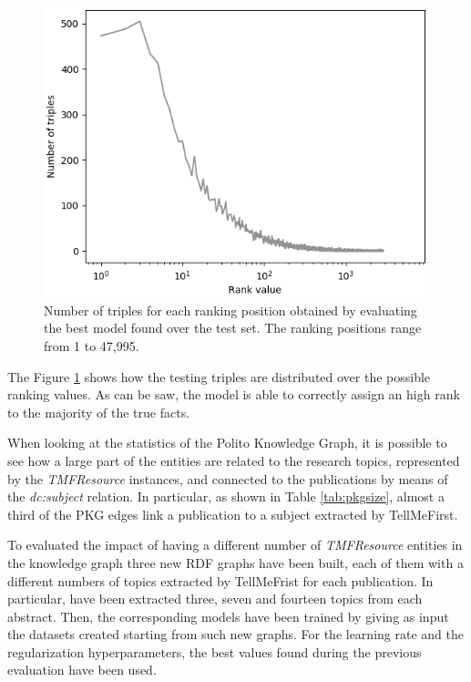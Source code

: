 \documentclass[%
    corpo=13.5pt,
    twoside,
    oldstyle,
    tipotesi=magistrale,
    greek,
    evenboxes
]{toptesi}
\begin{document}
\begin{figure}[h]
    \centering
    \includegraphics[scale=0.8]{img/num_triples_per_rank.png}
    \caption{
        Number of triples for each ranking position obtained by
        evaluating the best model found over the test set. The ranking
        positions range from 1 to 47,995.
    }
    \label{fig:num-triples-per-rank}
\end{figure}

The Figure \ref{fig:num-triples-per-rank} shows how the testing triples are
distributed over the possible ranking values.
As can be saw, the model is able to correctly assign an high rank to the
majority of the true facts.
\newpage

When looking at the statistics of the Polito Knowledge Graph, it is possible to
see how a large part of the entities are related
to the research topics, represented by the \emph{TMFResource} instances,
and connected to the publications by means of the \emph{dc:subject} relation.
In particular, as shown in Table \ref{tab:pkgsize}, almost a third of the
PKG edges link a publication to a subject extracted by TellMeFirst.

To evaluated the impact of having a different number of \emph{TMFResource}
entities in the knowledge graph three new RDF graphs have been built, each
of them with a different numbers of topics extracted by TellMeFrist for each
publication.
In particular, have been extracted three, seven and fourteen topics from each abstract.
Then, the corresponding models have been trained by giving as input the datasets
created starting from such new graphs.
For the learning rate and the regularization hyperparameters, the best
values found during the previous evaluation have been used.
\end{document}
